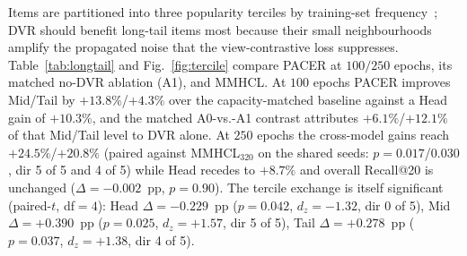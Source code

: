 \documentclass[conference]{IEEEtran}
\newcommand{\dvr}{DVR\xspace}
\begin{document}
Items are partitioned into three popularity terciles by training-set
frequency~\cite{krichene2020sampled}; \dvr should benefit
long-tail items most because their small neighbourhoods amplify the
propagated noise that the view-contrastive loss suppresses.
Table~\ref{tab:longtail} and Fig.~\ref{fig:tercile} compare PACER at
$100/250$ epochs, its matched no-\dvr ablation (A1), and MMHCL. At
$100$ epochs PACER improves Mid/Tail by $+13.8\%$/$+4.3\%$ over the
capacity-matched baseline against a Head gain of $+10.3\%$, and the
matched A0-vs.-A1 contrast attributes $+6.1\%$/$+12.1\%$ of that
Mid/Tail level to \dvr alone. At $250$ epochs the cross-model gains
reach $+24.5\%$/$+20.8\%$ (paired against MMHCL$_{320}$ on the shared
seeds: $p{=}0.017$/$0.030$, dir 5 of 5 and 4 of 5) while
Head recedes to $+8.7\%$ and overall Recall@20 is unchanged
($\Delta{=}{-}0.002$~pp, $p{=}0.90$). The tercile exchange is itself
significant (paired-$t$, df$=4$): Head $\Delta{=}{-}0.229$~pp
($p{=}0.042$, $d_{z}{=}{-}1.32$, dir 0 of 5), Mid
$\Delta{=}{+}0.390$~pp ($p{=}0.025$, $d_{z}{=}{+}1.57$, dir 5 of 5),
Tail $\Delta{=}{+}0.278$~pp ($p{=}0.037$, $d_{z}{=}{+}1.38$, dir
4 of 5).
\end{document}
